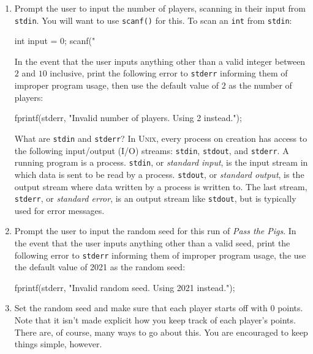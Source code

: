 \documentclass{article}
\begin{document}
\begin{enumerate}
  \item Prompt the user to input the number of players, scanning in
    their input from \texttt{stdin}. You will want to use
    \texttt{scanf()} for this. To scan an \texttt{int} from
    \texttt{stdin}:

\begin{clisting}{}
int input = 0;
scanf("%
\end{clisting}

    In the event that the user inputs anything other than a valid
    integer between $2$ and $10$ inclusive, print the following error to
    \texttt{stderr} informing them of improper program usage, then use
    the default value of $2$ as the number of players:

\begin{clisting}{}
fprintf(stderr, "Invalid number of players. Using 2 instead.\n");
\end{clisting}

    What are \texttt{stdin} and \texttt{stderr}? In \textsc{Unix}, every
    process on creation has access to the following input/output (I/O)
    streams: \texttt{stdin}, \texttt{stdout}, and \texttt{stderr}. A
    running program is a process. \texttt{stdin}, or \emph{standard
    input}, is the input stream in which data is sent to be read by a
    process. \texttt{stdout}, or \emph{standard output}, is the output
    stream where data written by a process is written to. The last
    stream, \texttt{stderr}, or \emph{standard error}, is an output
    stream like \texttt{stdout}, but is typically used for error
    messages.

  \item Prompt the user to input the random seed for this run of
    \emph{Pass the Pigs}. In the event that the user inputs anything
    other than a valid seed, print the following error to
    \texttt{stderr} informing them of improper program usage, the use
    the default value of 2021 as the random seed:

\begin{clisting}{}
fprintf(stderr, "Invalid random seed. Using 2021 instead.\n");
\end{clisting}

  \item Set the random seed and make sure that each
    player starts off with $0$ points. Note that it isn't made explicit
    how you keep track of each player's points. There are, of course,
    many ways to go about this. You are encouraged to keep things
    simple, however.


\end{enumerate}
\end{document}

